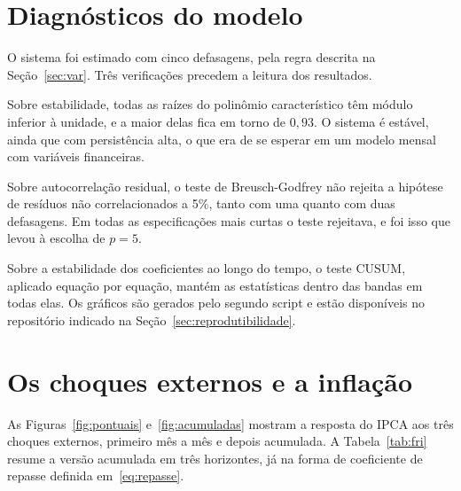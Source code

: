 \documentclass[12pt,openright,oneside,a4paper,portuguese,brazil]{abntex2}
\begin{document}
\section{Diagnósticos do modelo}
\label{sec:diagnosticos}

O sistema foi estimado com cinco defasagens, pela regra descrita na
Seção~\ref{sec:var}. Três verificações precedem a leitura dos
resultados.

Sobre estabilidade, todas as raízes do polinômio característico têm módulo
inferior à unidade, e a maior delas fica em torno de $0{,}93$. O sistema é
estável, ainda que com persistência alta, o que era de se esperar em um modelo
mensal com variáveis financeiras.

Sobre autocorrelação residual, o teste de Breusch-Godfrey não rejeita a
hipótese de resíduos não correlacionados a 5\%, tanto com uma quanto com duas
defasagens. Em todas as especificações mais curtas o teste rejeitava, e foi
isso que levou à escolha de $p = 5$.

Sobre a estabilidade dos coeficientes ao longo do tempo, o teste CUSUM,
aplicado equação por equação, mantém as estatísticas dentro das bandas em
todas elas. Os gráficos são gerados pelo segundo script e estão disponíveis no repositório
indicado na Seção~\ref{sec:reprodutibilidade}.

\section{Os choques externos e a inflação}
\label{sec:resultadosfri}

As Figuras~\ref{fig:pontuais} e~\ref{fig:acumuladas} mostram a resposta do
IPCA aos três choques externos, primeiro mês a mês e depois acumulada. A
Tabela~\ref{tab:fri} resume a versão acumulada em três horizontes, já na forma
de coeficiente de repasse definida em~\eqref{eq:repasse}.
\end{document}
